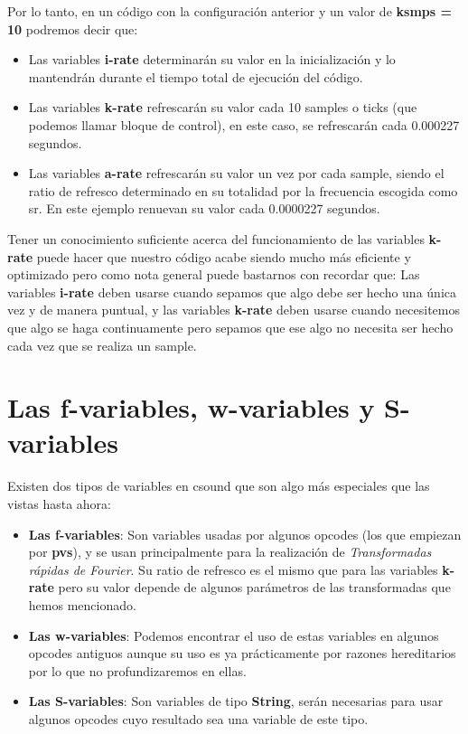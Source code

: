 Por lo tanto, en un código con la configuración anterior y un valor de \textbf{ksmps = 10} podremos decir que:

\begin{itemize}
 \item Las variables \textbf{i-rate} determinarán su valor en la inicialización y lo mantendrán durante el tiempo total de ejecución del código.
 \item Las variables \textbf{k-rate} refrescarán su valor cada 10 samples o ticks (que podemos llamar bloque de control), en este caso, se refrescarán cada 0.000227 segundos.
 \item Las variables \textbf{a-rate} refrescarán su valor un vez por cada sample, siendo el ratio de refresco determinado en su totalidad por la frecuencia escogida como sr. En este ejemplo renuevan su valor cada 0.0000227 segundos.
\end{itemize}

Tener un conocimiento suficiente acerca del funcionamiento de las variables \textbf{k-rate} puede hacer que nuestro código acabe siendo mucho más eficiente y optimizado pero como nota general puede bastarnos con recordar que: Las variables \textbf{i-rate} deben usarse cuando sepamos que algo debe ser hecho una única vez y de manera puntual, y las variables \textbf{k-rate} deben usarse cuando necesitemos que algo se haga continuamente pero sepamos que ese algo no necesita ser hecho cada vez que se realiza un sample.

\section{Las f-variables,  w-variables y S-variables}

Existen dos tipos de variables en csound que son algo más especiales que las vistas hasta ahora:

\begin{itemize}
 \item \textbf{Las f-variables}: Son variables usadas por algunos opcodes (los que empiezan por \textbf{pvs}), y se usan principalmente para la realización de \textsl{Transformadas rápidas de Fourier}. Su ratio de refresco es el mismo que para las variables \textbf{k-rate} pero su valor depende de algunos parámetros  de las transformadas que hemos mencionado.
 \item \textbf{Las w-variables}: Podemos encontrar el uso de estas variables en algunos opcodes antiguos aunque su uso es ya prácticamente por razones hereditarios por lo que no profundizaremos en ellas.
 \item \textbf{Las S-variables}: Son variables de tipo \textbf{String}, serán necesarias para usar algunos opcodes cuyo resultado sea una variable de este tipo.
\end{itemize}

